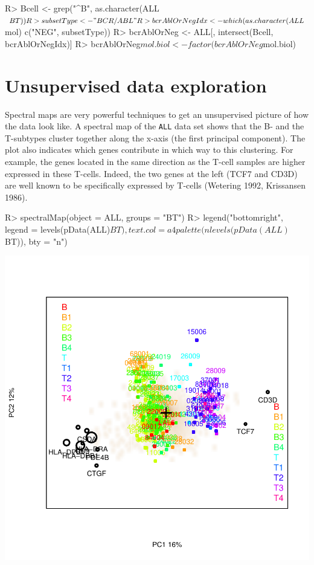 \documentclass[a4paper]{article}
\begin{document}
\begin{Schunk}
\begin{Sinput}
R> Bcell <- grep("^B", as.character(ALL$BT))
R> subsetType <- "BCR/ABL"
R> bcrAblOrNegIdx <- which(as.character(ALL$mol) %
     c("NEG", subsetType))
R> bcrAblOrNeg <- ALL[, intersect(Bcell, bcrAblOrNegIdx)]
R> bcrAblOrNeg$mol.biol <- factor(bcrAblOrNeg$mol.biol)
\end{Sinput}
\end{Schunk}

\pagebreak{}
\section{Unsupervised data exploration}

Spectral maps are very powerful techniques to get an unsupervised picture of how the data look like.
A spectral map of the \texttt{ALL} data set shows that the B- and the T-subtypes cluster together along the
 x-axis (the first principal component).
 The plot also indicates which genes contribute in which way to this clustering. For example, the genes located
 in the same direction as the T-cell samples are higher expressed in these T-cells. Indeed, the two genes at the
  left (TCF7 and CD3D) are well known to be specifically expressed by T-cells (Wetering 1992, Krissansen 1986).
 
\begin{Schunk}
\begin{Sinput}
R> spectralMap(object = ALL, groups = "BT")
R> legend("bottomright", legend = levels(pData(ALL)$BT), 
     text.col = a4palette(nlevels(pData(ALL)$BT)), 
     bty = "n")
\end{Sinput}
\end{Schunk}
\includegraphics{a4vignette-spectralMapALL}
\end{document}
